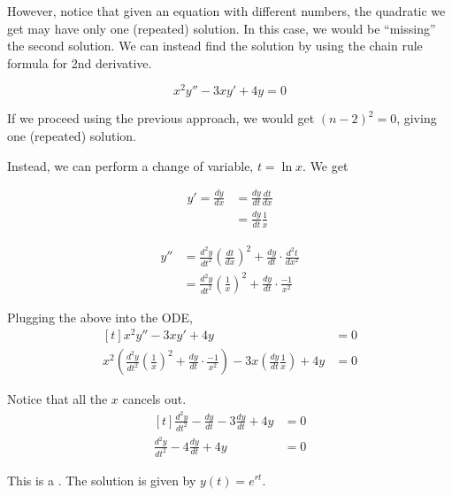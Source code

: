 \documentclass[11pt,fleqn]{book} %
\begin{document}
However, notice that given an equation with different numbers, the quadratic we get may have only one (repeated) solution. In this case, we would be ``missing'' the second solution. We can instead find the solution by using the chain rule formula for 2nd derivative. 

\begin{example}
    $$x^2y'' - 3xy' + 4y = 0$$

    If we proceed using the previous approach, we would get $(n - 2)^2 = 0$, giving one (repeated) solution.

    Instead, we can perform a change of variable, $t = \ln x$. We get 

    \begin{minipage}[t]{0.45\linewidth}
        \begin{align*}
            y' = \frac{dy}{dx} & = \frac{dy}{dt} \frac{dt}{dx} \\
                               & = \frac{dy}{dt} \frac{1}{x}
        \end{align*}
    \end{minipage}
    \begin{minipage}[t]{0.45\linewidth}
        \begin{align*}
            y'' & = \frac{d^2y}{dt^2} \left( \frac{dt}{dx} \right)^2 + \frac{dy}{dt} \cdot \frac{d^2t}{dx^2} \\
                & = \frac{d^2y}{dt^2} \left( \frac{1}{x} \right)^2 + \frac{dy}{dt} \cdot \frac{-1}{x^2}
        \end{align*}
    \end{minipage}

    Plugging the above into the ODE,
    $$\begin{aligned}[t]
        x^2y'' - 3xy' + 4y & = 0 \\
        x^2 \left( \frac{d^2y}{dt^2} \left( \frac{1}{x} \right)^2 + \frac{dy}{dt} \cdot \frac{-1}{x^2} \right) - 3x \left( \frac{dy}{dt} \frac{1}{x} \right) + 4y &= 0
    \end{aligned}$$

    Notice that all the $x$ cancels out.
    $$\begin{aligned}[t]
        \frac{d^2y}{dt^2} - \frac{dy}{dt} - 3\frac{dy}{dt} + 4y & = 0 \\
        \frac{d^2y}{dt^2} - 4\frac{dy}{dt} + 4y                 & = 0
    \end{aligned}$$

    This is a . The solution is given by $y(t) = e^{rt}$.


\end{example}
\end{document}
